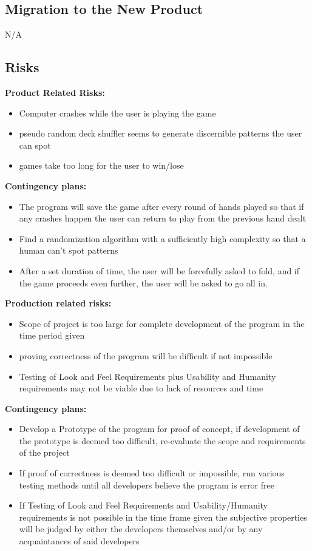 \documentclass[12pt]{article}
\begin{document}
	\subsection{Migration to the New Product}
	N/A
	\subsection{Risks}
	\textbf{Product Related Risks:}
	\begin{itemize}
	\item 	Computer crashes while the user is playing the game
	\item 	pseudo random deck shuffler seems to generate discernible patterns the user can 			spot
	\item 	games take too long for the user to win/lose 
	\end{itemize}
	\textbf{Contingency plans:}
	\begin{itemize}
	\item	The program will save the game after every round of hands played so that if any 			crashes happen the user can return to play from the previous hand dealt
	\item	Find a randomization algorithm with a sufficiently high complexity so that a 				human can't spot patterns
	\item	After a set duration of time, the user will be forcefully asked to fold, and if 			the game proceeds even further, the user will be asked to go all in.
	\end{itemize}
	\textbf{Production related risks:}
	\begin{itemize}
	\item	Scope of project is too large for complete development of the program in the 				time period given
	\item	proving correctness of the program will be difficult if not impossible
	\item 	Testing of Look and Feel Requirements plus Usability and Humanity requirements 				may not be viable due to lack of resources and time
	\end{itemize}
	\textbf{Contingency plans:}
	\begin{itemize}
	\item	Develop a Prototype of the program for proof of concept, if development of the 				prototype is deemed too difficult, re-evaluate the scope and requirements of 				the project 
	\item	If proof of correctness is deemed too difficult or impossible, run various 					testing methods until all developers believe the program is error free
	\item	If Testing of Look and Feel Requirements and Usability/Humanity requirements is 			not possible in the time frame given the subjective properties will be judged 				by either the developers themselves and/or by any acquaintances of said 					developers 
	\end{itemize}
\end{document}
